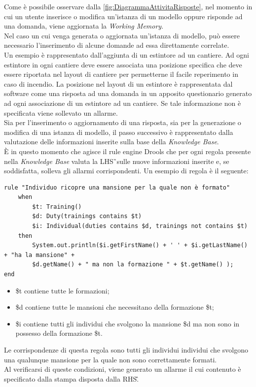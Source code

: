 Come è possibile osservare dalla \autoref{fig:DiagrammaAttivitaRisposte}, nel momento in cui un utente inserisce o modifica un'istanza di un modello oppure risponde ad una domanda, viene aggiornata la \textit{Working Memory}. \\
Nel caso un cui venga generata o aggiornata un'istanza di modello, può essere necessario l'inserimento di alcune domande ad essa direttamente correlate.\\
Un esempio è rappresentato dall'aggiunta di un estintore ad un cantiere. Ad ogni estintore in ogni cantiere deve essere associata una posizione specifica che deve essere riportata nel layout di cantiere per permetterne il facile reperimento in caso di incendio. La posizione nel layout di un estintore è rappresentata dal software come una risposta ad una domanda in un apposito questionario generato ad ogni associazione di un estintore ad un cantiere. Se tale informazione non è specificata viene sollevato un allarme.\\
Sia per l'inserimento o aggiornamento di una risposta, sia per la generazione o modifica di una istanza di modello, il passo successivo è rappresentato dalla valutazione delle informazioni inserite sulla base della \textit{Knowledge Base}. \\
È in questo momento che agisce il rule engine Drools che per ogni regola presente nella \textit{Knowledge Base} valuta la \gls{LHS}\G\ sulle nuove informazioni inserite e, se soddisfatta, solleva gli allarmi corrispondenti. 
Un esempio di regola è il seguente:


\begin{verbatim}
rule "Individuo ricopre una mansione per la quale non è formato"
	when
		$t: Training()
		$d: Duty(trainings contains $t)
		$i: Individual(duties contains $d, trainings not contains $t)
	then
		System.out.println($i.getFirstName() + ' ' + $i.getLastName() + "ha la mansione" +
		$d.getName() + " ma non la formazione " + $t.getName() );
end
\end{verbatim}
\begin{itemize}
	\item \$t contiene tutte le formazioni;
	\item \$d contiene  tutte le mansioni che necessitano della formazione \$t;
	\item \$i contiene tutti gli individui che svolgono la mansione \$d ma non sono in possesso della formazione \$t.
\end{itemize}
Le corrispondenze di questa regola sono tutti gli individui individui che svolgono una qualunque mansione per la quale non sono correttamente formati.\\
Al verificarsi di queste condizioni, viene generato un allarme il cui contenuto è specificato dalla stampa disposta dalla \gls{RHS}\G.


